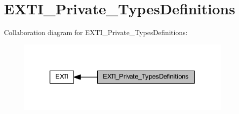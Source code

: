 \hypertarget{group___e_x_t_i___private___types_definitions}{}\section{E\+X\+T\+I\+\_\+\+Private\+\_\+\+Types\+Definitions}
\label{group___e_x_t_i___private___types_definitions}
Collaboration diagram for E\+X\+T\+I\+\_\+\+Private\+\_\+\+Types\+Definitions\+:
\nopagebreak
\begin{figure}[H]
\begin{center}
\leavevmode
\includegraphics[width=299pt]{group___e_x_t_i___private___types_definitions}
\end{center}
\end{figure}
